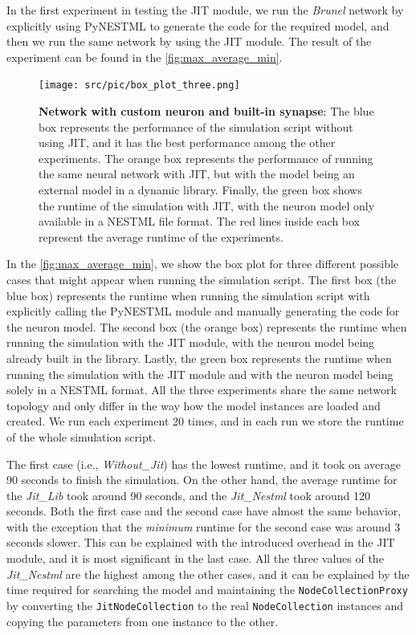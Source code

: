 In the first experiment in testing the JIT module, we run the \emph{Brunel} network by explicitly using PyNESTML to generate the code for the required model, and then we run the same network by using the JIT module. The result of the experiment can be found in the \autoref{fig:max_average_min}.

\begin{figure}[ht!]
    \centering
    \texttt{[image: src/pic/box\_plot\_three.png]}
    \caption{\textbf{Network with custom neuron and built-in synapse}: The blue box represents the performance of the simulation script without using JIT, and it has the best performance among the other experiments. The orange box represents the performance of running the same neural network with JIT, but with the model being an external model in a dynamic library. Finally, the green box shows the runtime of the simulation with JIT, with the neuron model only available in a NESTML file format. The red lines inside each box represent the average runtime of the experiments.}
    \label{fig:max_average_min}
\end{figure}

In the \autoref{fig:max_average_min}, we show the box plot for three different possible cases that might appear when running the simulation script. The first box (the blue box) represents the runtime when running the simulation script with explicitly calling the PyNESTML module and manually generating the code for the neuron model. The second box (the orange box) represents the runtime when running the simulation with the JIT module, with the neuron model being already built in the library. Lastly, the green box represents the runtime when running the simulation with the JIT module and with the neuron model being solely in a NESTML format. All the three experiments share the same network topology and only differ in the way how the model instances are loaded and created. We run each experiment 20 times, and in each run we store the runtime of the whole simulation script.

The first case (i.e., \emph{Without\_Jit}) has the lowest runtime, and it took on average 90 seconds to finish the simulation. On the other hand, the average runtime for the \emph{Jit\_Lib} took around 90 seconds, and the \emph{Jit\_Nestml} took around 120 seconds.  Both the first case and the second case have almost the same behavior, with the exception that the \emph{minimum} runtime for the second case was around 3 seconds slower. This can be explained with the introduced overhead in the JIT module, and it is most significant in the last case. All the three values of the \emph{Jit\_Nestml} are the highest among the other cases, and it can be explained by the time required for searching the model and maintaining the \texttt{NodeCollectionProxy} by converting the \texttt{JitNodeCollection} to the real \texttt{NodeCollection} instances and copying the parameters from one instance to the other.


